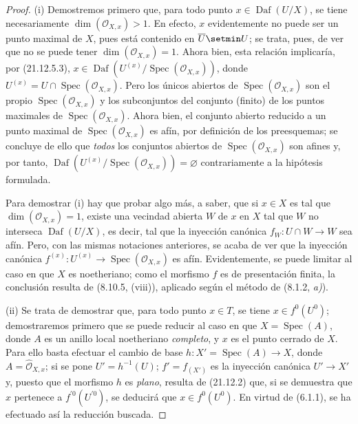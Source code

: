 \begin{proof}
(i) Demostremos primero que, para todo punto $x\in\operatorname{Daf}(U/X)$, se tiene
necesariamente $\dim(\mathcal O_{X,x})>1$. En efecto, $x$ evidentemente no puede ser un punto
maximal de $X$, pues está contenido en $\overline U\setmin U$; se trata, pues, de ver que no se
puede tener $\dim(\mathcal O_{X,x})=1$. Ahora bien, esta relación implicaría, por (21.12.5.3),
$x\in\operatorname{Daf}(U^{(x)}/\operatorname{Spec}(\mathcal O_{X,x}))$, donde
$U^{(x)}=U\cap\operatorname{Spec}(\mathcal O_{X,x})$. Pero los únicos abiertos de
$\operatorname{Spec}(\mathcal O_{X,x})$ son el propio $\operatorname{Spec}(\mathcal O_{X,x})$
y los subconjuntos del conjunto (finito) de los puntos maximales de
$\operatorname{Spec}(\mathcal O_{X,x})$. Ahora bien, el conjunto abierto reducido a un punto maximal
de $\operatorname{Spec}(\mathcal O_{X,x})$ es afín, por definición de los preesquemas; se
concluye de ello que \emph{todos} los conjuntos abiertos de
$\operatorname{Spec}(\mathcal O_{X,x})$ son afines y, por tanto,
$\operatorname{Daf}(U^{(x)}/\operatorname{Spec}(\mathcal O_{X,x}))=\varnothing$
contrariamente a la hipótesis formulada.

Para demostrar (i) hay que probar algo más, a saber, que si $x\in X$ es tal que
$\dim(\mathcal O_{X,x})=1$, existe una vecindad abierta $W$ de $x$ en $X$ tal que
$W$ no interseca $\operatorname{Daf}(U/X)$, es decir, tal que la inyección
canónica $f_W:U\cap W\to W$ sea afín. Pero, con las mismas notaciones anteriores,
se acaba de ver que la inyección canónica
$f^{(x)}:U^{(x)}\to\operatorname{Spec}(\mathcal O_{X,x})$ es afín. Evidentemente, se
puede limitar al caso en que $X$ es noetheriano; como el morfismo $f$ es de
presentación finita, la conclusión resulta de (8.10.5, (viii)), aplicado según el
método de (8.1.2, \emph{a)}).

(ii) Se trata de demostrar que, para todo punto $x\in T$, se tiene $x\in f^0(U^0)$;
demostraremos primero que se puede reducir al caso en que $X=\operatorname{Spec}(A)$, donde
$A$ es un anillo local noetheriano \emph{completo}, y $x$ es el punto cerrado de $X$. Para
ello basta efectuar el cambio de base
$h:X'=\operatorname{Spec}(A)\to X$, donde $A=\widehat{\mathcal O}_{X,x}$; si se pone
$U'=h^{-1}(U)$; $f'=f_{(X')}$ es la inyección canónica $U'\to X'$ y, puesto que el
morfismo $h$ es \emph{plano}, resulta de (21.12.2) que, si se demuestra que $x$ pertenece a
$f^{\prime 0}(U^{\prime 0})$, se deducirá que $x\in f^0(U^0)$. En virtud de (6.1.1), se ha
efectuado así la reducción buscada.


\end{proof}
